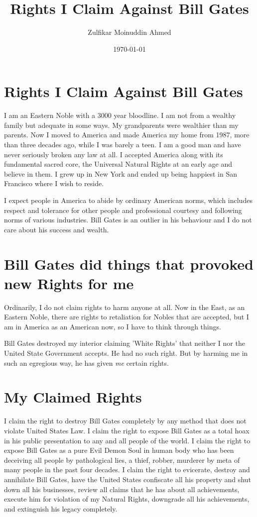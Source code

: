\documentclass{amsart}
\title{Rights I Claim Against Bill Gates}
\author{Zulfikar Moinuddin Ahmed}
\date{\today}
\begin{document}
\maketitle

\section{Rights I Claim Against Bill Gates}

I am an Eastern Noble with a 3000 year bloodline.  I am not from a wealthy family but adequate in some ways.  My grandparents were wealthier than my parents.  Now I moved to America and made America my home from 1987, more than three decades ago, while I was barely a teen.  I am a good man and have never seriously broken any law at all.  I accepted America along with its fundamental sacred core, the Universal Natural Rights at an early age and believe in them.  I grew up in New York and ended up being happiest in San Francisco where I wish to reside.

I expect people in America to abide by ordinary American norms, which includes respect and tolerance for other people and professional courtesy and following norms of various industries.  Bill Gates is an outlier in his behaviour and I do not care about his success and wealth.

\section{Bill Gates did things that provoked new Rights for me}

Ordinarily, I do not claim rights to harm anyone at all.  Now in the East, as an Eastern Noble, there are rights to retaliation for Nobles that are accepted, but I am in America as an American now, so I have to think through things.

Bill Gates destroyed my interior claiming 'White Rights' that neither I nor the United State Government accepts.  He had no such right.  But by harming me in such an egregious way, he has given {\em me} certain rights.

\section{My Claimed Rights}

I claim the right to destroy Bill Gates completely by any method that does not violate United States Law.  I claim the right to expose Bill Gates as a total hoax in his public presentation to any and all people of the world.  I claim the right to expose Bill Gates as a pure Evil Demon Soul in human body who has been deceiving all people by pathological lies, a thief, robber, murderer by meta of many people in the past four decades.  I claim the right to evicerate, destroy and annihilate Bill Gates, have the United States confiscate all his property and shut down all his businesses, review all claims that he has about all achievements, execute him for violation of my Natural Rights, downgrade all his achievements, and extinguish his legacy completely.  
\end{document}
